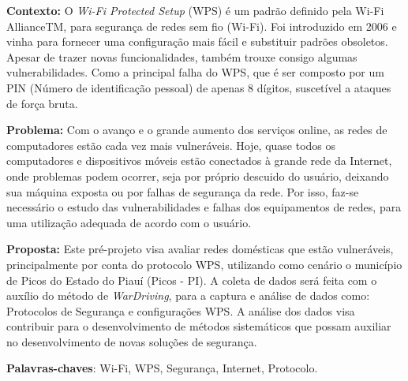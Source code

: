 \documentclass[
	article,			%
	11pt,				%
	oneside,			%
	a4paper,			%
	english,			%
	brazil,				%
	sumario=tradicional
	]{abntex2}
\begin{document}
\frenchspacing 


\maketitle

\begin{resumoumacoluna}
\textbf{Contexto:} 
O \textit{Wi-Fi Protected Setup} (WPS) é um padrão definido pela Wi-Fi AllianceTM, para segurança de redes sem fio (Wi-Fi). Foi introduzido em 2006 e vinha para fornecer uma configuração mais fácil e substituir padrões obsoletos. Apesar de trazer novas funcionalidades, também trouxe consigo algumas vulnerabilidades. Como a principal falha do WPS, que é ser composto por um PIN (Número de identificação pessoal) de apenas 8 dígitos, suscetível a ataques de força bruta.

\textbf{Problema:}
Com o avanço e o grande aumento dos serviços online, as redes de computadores estão cada vez mais vulneráveis. 
Hoje, quase todos os computadores e dispositivos móveis estão conectados à grande rede da Internet, onde problemas podem ocorrer, seja por próprio descuido do usuário, deixando sua máquina exposta ou por falhas de segurança da rede. Por isso, faz-se necessário o estudo das vulnerabilidades e falhas dos equipamentos de redes, para uma utilização adequada de acordo com o usuário.

\indent
\textbf{Proposta:}
Este pré-projeto visa avaliar redes domésticas que estão vulneráveis, principalmente por conta do protocolo WPS, utilizando como cenário o município de Picos do Estado do Piauí (Picos - PI). 
A coleta de dados será feita com o auxílio do método de \textit{WarDriving}, para a captura e análise de dados como: Protocolos de Segurança e configurações WPS.  
A análise dos dados visa contribuir para o desenvolvimento de métodos sistemáticos que possam auxiliar no desenvolvimento de novas soluções de segurança. 


 \vspace{\onelineskip}
 
 \noindent
\textbf{Palavras-chaves}: Wi-Fi, WPS, Segurança, Internet, Protocolo.

\end{resumoumacoluna}
\end{document}
